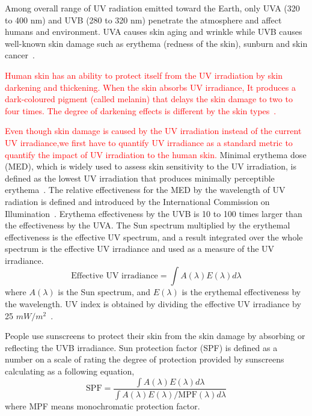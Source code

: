 \documentclass[journal]{IEEEtran}
\begin{document}
Among overall range of UV radiation emitted toward the Earth, only UVA (320 to 400 nm) and UVB (280 to 320 nm) penetrate the atmosphere and affect humans and environment. UVA causes skin aging and wrinkle while UVB causes well-known skin damage such as erythema (redness of the skin), sunburn and skin cancer~\cite{Matsumura:TAP04}.

\textcolor{red}{Human skin has an ability to protect itself from the UV irradiation by skin darkening and thickening. When the skin absorbs UV irradiance, It produces a dark-coloured pigment (called melanin) that delays the skin damage to two to four times. The degree of darkening effects is different by the skin types~\cite{Harrison:Method02}.}


\textcolor{red}{Even though skin damage is caused by the UV irradiation instead of the current UV irradiance,we first have to quantify UV irradiance as  a standard metric to quantify the impact of UV irradiation to the human skin.}
Minimal erythema dose (MED), which is widely used to assess skin sensitivity to the UV irradiation, is defined as the lowest UV irradiation that produces minimally perceptible erythema~\cite{Diffey:CPPM91}. The relative effectiveness for the MED by the wavelength of UV radiation is defined and introduced by the International Commission on Illumination~\cite{CIE}. Erythema effectiveness by the UVB is 10 to 100 times larger than the effectiveness by the UVA. The Sun spectrum multiplied by the erythemal effectiveness is the effective UV spectrum, and a result integrated over the whole spectrum is the effective UV irradiance and used as a measure of the UV irradiance.
%
\begin{equation}
\text{Effective~UV~irradiance} = \int A(\lambda)E(\lambda) d \lambda
 \end{equation}
%
where $A(\lambda)$ is the Sun spectrum, and $E(\lambda)$ is the erythemal effectiveness by the wavelength. UV index is obtained by dividing the effective UV irradiance by 25 $mW/m^2$~\cite{CIE}.



People use sunscreens to protect their skin from the skin damage by absorbing or reflecting the UVB irradiance. Sun protection factor (SPF) is defined as a number on a scale of rating the degree of protection provided by sunscreens calculating as a following equation,
%
\begin{equation}
\text{SPF} = \frac{\int A(\lambda)E(\lambda) d \lambda}{\int A(\lambda)E(\lambda) / \text{MPF}(\lambda) d \lambda}
 \end{equation}
%
where MPF means monochromatic protection factor.
\end{document}

